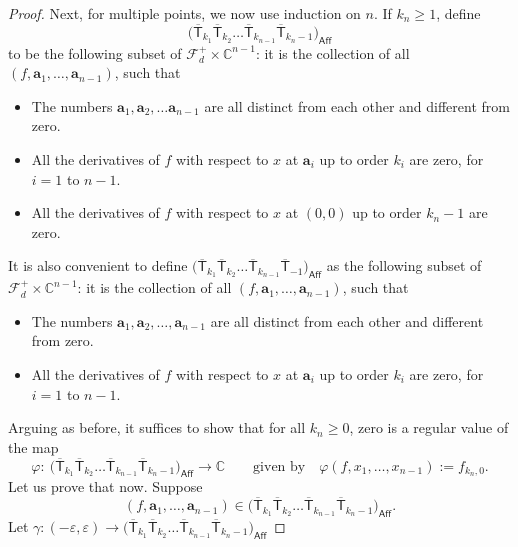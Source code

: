 \documentclass[11pt]{article}
\numberwithin{equation}{section}
\begin{document}
\begin{proof}
Next, for multiple points, we now use induction on
$n$. If $k_n \geq 1$, define
\[\bigl(\overline{\mathsf{T}}_{k_1} \overline{\mathsf{T}}_{k_2}
\dots \overline{\mathsf{T}}_{k_{n-1}} \overline{\mathsf{T}}_{k_{n}-1}\bigr)_{\mathsf{Aff}}
\]
to be the following subset of $\mathcal{F}_d^{+} \times \mathbb{C}^{n-1}$: it is
the collection of all $(f, \mathbf{a}_1, \dots, \mathbf{a}_{n-1})$, such that
\begin{itemize}\itemsep=0pt
\item The numbers
$\mathbf{a}_1, \mathbf{a}_2, \dots \mathbf{a}_{n-1}$ are all distinct
from each other and different from zero.
\item All the derivatives of $f$ with respect to $x$
at $\mathbf{a}_i$ up to order $k_i$ are zero, for $i=1$ to $n-1$.
\item All the derivatives of $f$ with respect to $x$
at $(0, 0)$ up to order $k_n-1$ are zero.
\end{itemize}
It is also convenient to define
$\bigl(\overline{\mathsf{T}}_{k_1} \overline{\mathsf{T}}_{k_2}
\dots \overline{\mathsf{T}}_{k_{n-1}} \overline{\mathsf{T}}_{-1}\bigr)_{\mathsf{Aff}}$
as the following subset of $\mathcal{F}_d^{+} \times \mathbb{C}^{n-1}$: it is
the collection of all $(f, \mathbf{a}_1, \dots, \mathbf{a}_{n-1})$, such that
\begin{itemize}\itemsep=0pt
\item The numbers
$\mathbf{a}_1, \mathbf{a}_2, \dots , \mathbf{a}_{n-1}$ are all distinct
from each other and different from zero.
\item All the derivatives of $f$ with respect to $x$
at $\mathbf{a}_i$ up to order $k_i$ are zero, for $i=1$ to $n-1$.
\end{itemize}
Arguing as before,
it suffices to show that for all $k_n \geq 0$, zero is a regular value of the map
\[\varphi \colon\ \bigl(\overline{\mathsf{T}}_{k_1} \overline{\mathsf{T}}_{k_2}
\dots \overline{\mathsf{T}}_{k_{n-1}} \overline{\mathsf{T}}_{k_{n}-1}\bigr)_{\mathsf{Aff}}
 \longrightarrow \mathbb{C} \qquad \text{given by}
\quad \varphi(f, x_1, \dots, x_{n-1}) := f_{k_n, 0}. \]
Let us prove that now. Suppose
\[(f,\mathbf{a}_1, \dots, \mathbf{a}_{n-1})
\in \bigl(\overline{\mathsf{T}}_{k_1} \overline{\mathsf{T}}_{k_2}
\dots \overline{\mathsf{T}}_{k_{n-1}} \overline{\mathsf{T}}_{k_{n}-1}\bigr)_{\mathsf{Aff}}.\]
Let $\gamma\colon(-\varepsilon, \varepsilon)\longrightarrow
\bigl(\overline{\mathsf{T}}_{k_1} \overline{\mathsf{T}}_{k_2}
\dots \overline{\mathsf{T}}_{k_{n-1}} \overline{\mathsf{T}}_{k_{n}-1}\bigr)_{\mathsf{Aff}}$

\end{proof}
\end{document}
